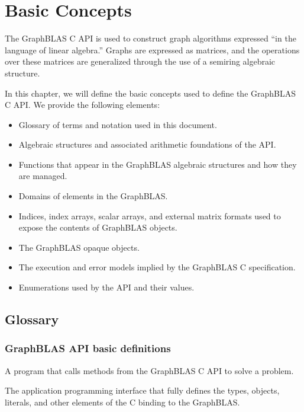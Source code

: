 \chapter{Basic Concepts}
\label{Chp:Concepts}

The GraphBLAS C API is used to construct  
graph algorithms expressed ``in the language of linear algebra.''
Graphs are expressed as matrices, and the operations over 
these matrices are generalized through the use of a
semiring algebraic structure.

In this chapter, we will define the basic concepts used to
define the GraphBLAS C API.  We provide the following elements:

\begin{itemize}
\item Glossary of terms and notation used in this document.  
\item Algebraic structures and associated arithmetic foundations of the API.
\item Functions that appear in the GraphBLAS algebraic structures and how they are managed.
\item Domains of elements in the GraphBLAS.
\item Indices, index arrays, scalar arrays, and external matrix formats used to expose the contents of GraphBLAS objects.
\item The GraphBLAS opaque objects. 
\item The execution and error models implied by the GraphBLAS C specification.
\item Enumerations used by the API and their values.
\end{itemize}

\section{Glossary}


\subsection{GraphBLAS API basic definitions}

\glossBegin

 A program that calls methods from the GraphBLAS C API to
solve a problem.

 The application programming interface that fully defines the types, objects, 
literals, and other elements of the C binding to the GraphBLAS.

